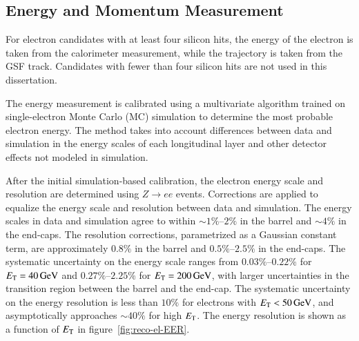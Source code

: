\subsection{Energy and Momentum Measurement}\label{sec:reco-electron-energymomentum}
For electron candidates with at least four silicon hits, the energy of the electron is taken from the calorimeter measurement, while the trajectory is taken from the GSF track. Candidates with fewer than four silicon hits are not used in this dissertation.

The energy measurement is calibrated using a multivariate algorithm trained on single-electron Monte Carlo (MC) simulation to determine the most probable electron energy. The method takes into account differences between data and simulation in the energy scales of each longitudinal layer and other detector effects not modeled in simulation. 

After the initial simulation-based calibration, the electron energy scale and resolution are determined using $Z\rightarrow ee$ events. Corrections are applied to equalize the energy scale and resolution between data and simulation. The energy scales in data and simulation agree to within $\sim1\%$--$2\%$ in the barrel and $\sim4\%$ in the end-caps. The resolution corrections, parametrized as a Gaussian constant term, are approximately $0.8\%$ in the barrel and $0.5\%$--$2.5\%$ in the end-caps. The systematic uncertainty on the energy scale ranges from $0.03\%$--$0.22$\% for $E_{\mathrm{T}}=\SI{40}{\giga\electronvolt}$ and $0.27\%$--$2.25$\% for $E_{\mathrm{T}} = \SI{200}{\giga\electronvolt}$, with larger uncertainties in the transition region between the barrel and the end-cap. The systematic uncertainty on the energy resolution is less than $10\%$ for electrons with $E_{\mathrm{T}}<\SI{50}{\giga\electronvolt}$, and asymptotically approaches $\sim 40\%$ for high $E_{\mathrm{T}}$.  The energy resolution is shown as a function of $E_{\text{T}}$ in figure~\ref{fig:reco-el-EER}.

